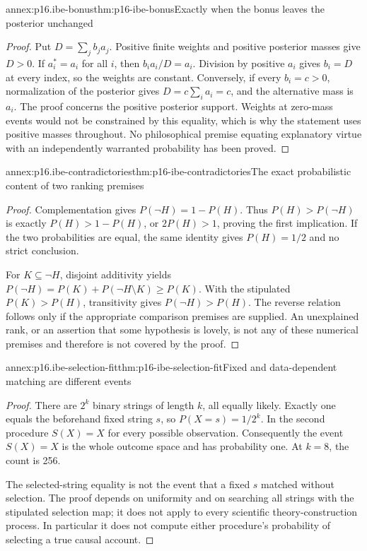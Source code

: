 \begin{annexitem}{annex:p16.ibe-bonus}{thm:p16-ibe-bonus}{Exactly when the bonus leaves the posterior unchanged}
\begin{proof}
Put \(D=\sum_jb_j a_j\). Positive finite weights and positive
posterior masses give \(D>0\). If \(a_i^*=a_i\) for all \(i\),
then \(b_i a_i/D=a_i\). Division by positive \(a_i\) gives
\(b_i=D\) at every index, so the weights are constant. Conversely,
if every \(b_i=c>0\), normalization of the posterior gives
\(D=c\sum_i a_i=c\), and the alternative mass is \(a_i\).
The proof concerns the positive posterior support. Weights at zero-mass
events would not be constrained by this equality, which is why the statement
uses positive masses throughout. No philosophical premise equating
explanatory virtue with an independently warranted probability has been proved.
\end{proof}
\end{annexitem}

\begin{annexitem}{annex:p16.ibe-contradictories}{thm:p16-ibe-contradictories}{The exact probabilistic content of two ranking premises}
\begin{proof}
Complementation gives \(P(\neg H)=1-P(H)\). Thus
\(P(H)>P(\neg H)\) is exactly \(P(H)>1-P(H)\), or
\(2P(H)>1\), proving the first implication. If the two probabilities
are equal, the same identity gives \(P(H)=1/2\) and no strict conclusion.

For \(K\subseteq\neg H\), disjoint additivity yields
\(P(\neg H)=P(K)+P(\neg H\setminus K)\ge P(K)\).
With the stipulated \(P(K)>P(H)\), transitivity gives
\(P(\neg H)>P(H)\). The reverse relation follows only if the
appropriate comparison premises are supplied. An unexplained rank, or
an assertion that some hypothesis is lovely, is not any of these numerical
premises and therefore is not covered by the proof.
\end{proof}
\end{annexitem}

\begin{annexitem}{annex:p16.ibe-selection-fit}{thm:p16-ibe-selection-fit}{Fixed and data-dependent matching are different events}
\begin{proof}
There are \(2^k\) binary strings of length \(k\), all equally likely.
Exactly one equals the beforehand fixed string \(s\), so
\(P(X=s)=1/2^k\). In the second procedure \(S(X)=X\) for every
possible observation. Consequently the event \(S(X)=X\) is the whole
outcome space and has probability one. At \(k=8\), the count is 256.

The selected-string equality is not the event that a fixed \(s\) matched
without selection. The proof depends on uniformity and on searching all
strings with the stipulated selection map; it does not apply to every
scientific theory-construction process. In particular it does not compute
either procedure's probability of selecting a true causal account.
\end{proof}
\end{annexitem}
